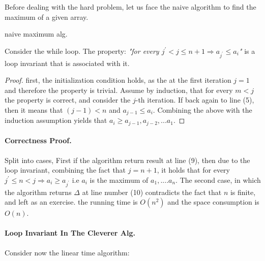 \begin{example} Before dealing with the hard problem, let us face the naive algorithm to find the maximum of a given array.

\begin{algorithm}
\caption{naive maximum alg.}
\end{algorithm}

\begin{claim} Consider the while loop. The property: \textit{"for every \(j^\prime < j \le n+1 \Rightarrow a_{j^\prime} \le a_i \)"} is a loop invariant that is associated with it. 
\end{claim}
\begin{proof} first, the initialization condition holds, as the at the first iteration \(j=1\) and therefore the property is trivial.
Assume by induction, that for every \(m < j\) the property is correct, and consider the \(j\)-th iteration. If back again to line (5), then it means that \( (j-1) < n\) and \( a_{j-1} \le a_{i} \). Combining the above with the induction assumption yields that \(a_i \ge a_{j-1},a_{j-2}, ... a_{1}\).    
\end{proof}

\paragraph{Correctness Proof.} Split into cases, First if the algorithm return result at line (9), then due to the loop invariant, combining the fact that \( j = n + 1\), it holds that for every \(j^\prime  \le n < j \Rightarrow a_i \ge a_{j^\prime} \)  i.e \(a_i\) is the maximum of \(a_1, .... a_n \). The second case, in which the algorithm returns \( \Delta \) at line number (10) contradicts the fact that \(n\) is finite, and left as an exercise.  the running time is \( O(n^2) \) and the space consumption is \(O(n)\). 

\paragraph{Loop Invariant In The Cleverer Alg.} Consider now the linear time algorithm:


\end{example}
